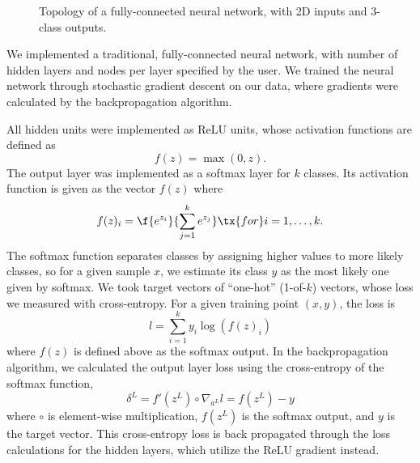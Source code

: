 \documentclass{article}
\begin{document}
\begin{multicols}{2}
\begin{figure}[t]
    \caption{Topology of a fully-connected neural network, with 2D inputs and 3-class outputs.}
\end{figure}

We implemented a traditional, fully-connected neural network,
with number of hidden layers and nodes per layer specified by the user.
We trained the neural network
through stochastic gradient descent on our data,
where gradients were calculated by the
backpropagation algorithm.

All hidden units were implemented as ReLU units,
whose activation functions are defined as
\begin{equation}
    f(z) = \max(0, z).
\end{equation}
The output layer was implemented as a softmax layer for $k$ classes.
Its activation function is given as the vector $f(z)$ where
\begin{equation}
    f(z)_i = \f{e^{z_i}}{\sum_{j=1}^{k}{e^{z_j}}} \tx{ for } i = 1,\dots,k.
\end{equation}
The softmax function separates classes
by assigning higher values to more likely classes,
so for a given sample $x$, we estimate its class $y$ as the most likely one
given by softmax.
We took target vectors of ``one-hot'' (1-of-$k$) vectors,
whose loss we measured with cross-entropy.
For a given training point $(x,y)$, the loss is
\begin{equation}
    l = \sum_{i = 1}^k{y_i \log(f(z)_i)}
\end{equation}
where $f(z)$ is defined above as the softmax output.
In the backpropagation algorithm,
we calculated the output layer loss using
the cross-entropy of the softmax function,
\begin{equation}
    \delta^L = f'(z^L)\circ\nabla_{a^L}l = f(z^L) - y
\end{equation}
where $\circ$ is element-wise multiplication, $f(z^L)$ is the softmax output,
and $y$ is the target vector.
This cross-entropy loss is back propagated through the 
loss calculations for the hidden layers,
which utilize the ReLU gradient instead.


\end{multicols}
\end{document}
